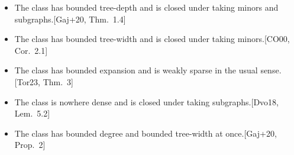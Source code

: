 \begin{itemize}
\item The class has bounded tree-depth and is closed under taking minors and subgraphs.\hfill [Gaj+20, Thm.~1.4]
\item The class has bounded tree-width and is closed under taking minors.\hfill [CO00, Cor.~2.1]
\item The class has bounded expansion and is weakly sparse in the usual sense.\hfill [Tor23, Thm.~3]
\item The class is nowhere dense and is closed under taking subgraphs.\hfill [Dvo18, Lem.~5.2]
\item The class has bounded degree and bounded tree-width at once.\hfill [Gaj+20, Prop.~2]
\end{itemize}

